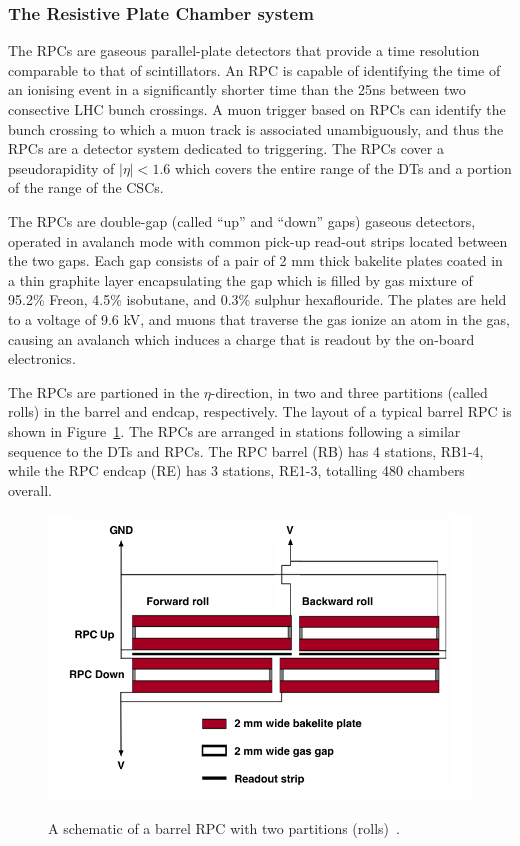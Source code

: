 \subsubsection{The Resistive Plate Chamber system}
\label{rpcs}

The RPCs are gaseous parallel-plate detectors that provide a time resolution comparable to that of scintillators.  An RPC is capable of identifying the time of an ionising event in a significantly shorter time than the 25ns between two consective LHC bunch crossings.  A muon trigger based on RPCs can identify the bunch crossing to which a muon track is associated unambiguously, and thus the RPCs are a detector system dedicated to triggering.  The RPCs cover a pseudorapidity of $|\eta| < 1.6$ which covers the entire range of the DTs and a portion of the range of the CSCs.  

The RPCs are double-gap (called ``up'' and ``down'' gaps) gaseous detectors, operated in avalanch mode with common pick-up read-out strips located between the two gaps.  Each gap consists of a pair of 2 mm thick bakelite plates coated in a thin graphite layer encapsulating the gap which is filled by gas mixture of 95.2\% Freon, 4.5\% isobutane, and 0.3\% sulphur hexaflouride.  The plates are held to a voltage of 9.6 kV, and muons that traverse the gas ionize an atom in the gas, causing an avalanch which induces a charge that is readout by the on-board electronics.  

The RPCs are partioned in the $\eta$-direction, in two and three partitions (called rolls) in the barrel and endcap, respectively.  The layout of a typical barrel RPC is shown in Figure~\ref{figapp:RPClayout}.  The RPCs are arranged in stations following a similar sequence to the DTs and RPCs.  The RPC barrel (RB) has 4 stations, RB1-4, while the RPC endcap (RE) has 3 stations, RE1-3, totalling 480 chambers overall.  



\begin{figure}[!Hh]
       \includegraphics[scale=0.6]{Figures/RPClayout.png} \\
       \caption[The layout of a resistive plate chamber.]{A schematic of a barrel RPC with two partitions (rolls)~\cite{CMSperformance}.}
\label{figapp:RPClayout}
\end{figure}



